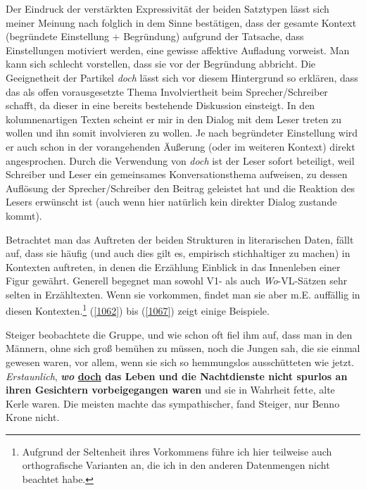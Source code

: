 Der Eindruck der verstärkten Expressivität der beiden Satztypen lässt sich meiner Meinung nach folglich in dem Sinne bestätigen, dass der gesamte Kontext (begründete Einstellung + Begründung) aufgrund der Tatsache, dass Einstellungen motiviert werden, eine gewisse affektive Aufladung vorweist. Man kann sich schlecht vorstellen, dass sie vor der Begründung abbricht. Die Geeignetheit der Partikel \textit{doch} lässt sich vor diesem Hintergrund so erklären, dass das als offen vorausgesetzte Thema Involviertheit beim Sprecher/Schreiber schafft, da dieser in eine bereits bestehende Diskussion einsteigt. In den kolumnenartigen Texten scheint er mir in den Dialog mit dem Leser treten zu wollen und ihn somit involvieren zu wollen. Je nach begründeter Einstellung wird er auch schon in der vorangehenden Äußerung (oder im weiteren Kontext) direkt angesprochen. Durch die Verwendung von \textit{doch} ist der Leser sofort beteiligt, weil Schreiber und Leser ein gemeinsames Konversationsthema aufweisen, zu dessen Auflösung der Sprecher\slash Schreiber den  Beitrag geleistet hat und die Reaktion des Lesers erwünscht ist (auch wenn hier natürlich kein direkter Dialog zustande kommt).

Betrachtet man das Auftreten der beiden Strukturen in literarischen Daten, fällt auf, dass sie häufig (und auch dies gilt es, empirisch stichhaltiger zu machen) in Kontexten auftreten, in denen die Erzählung Einblick in das Innenleben einer Figur gewährt. Generell begegnet man sowohl V1- als auch \textit{Wo}-VL-Sätzen sehr selten in Erzähltexten. Wenn sie vorkommen, findet man sie aber m.E. auffällig in diesen Kontexten.\footnote{ Aufgrund der Seltenheit ihres Vorkommens führe ich hier teilweise auch orthografische Varianten an, die ich in den anderen Datenmengen nicht beachtet habe.} (\ref{1062}) bis (\ref{1067}) zeigt einige Beispiele.

\begin{exe}
	\ex\label{1062} 

	Steiger beobachtete die Gruppe, und wie schon oft fiel ihm auf, dass man in den Männern, ohne sich groß bemühen zu müssen, noch die Jungen sah, die sie 	einmal gewesen waren, vor allem, wenn sie sich so hemmungslos ausschütteten wie jetzt. \emph{Erstaunlich}, \textbf{\textit{wo} \ul{doch} das 		Leben und die Nachtdienste nicht spurlos an ihren Gesichtern vorbeigegangen waren} und sie in Wahrheit fette, alte Kerle waren. Die meisten machte das 		sympathischer, fand Steiger, nur Benno Krone nicht.
	\newline              		
	\hbox{}\hfill\hbox{\citet[187--188]{Horst2011}}
\end{exe}

